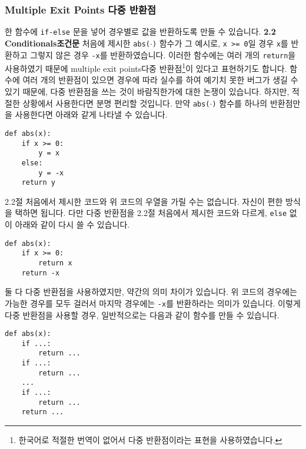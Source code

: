 \documentclass[../main.tex]{subfiles}
\begin{document}
\subsubsection{Multiple Exit Points 다중 반환점}
한 함수에 \texttt{if-else} 문을 넣어 경우별로 값을 반환하도록 만들 수 있습니다.
\textbf{2.2 Conditionals조건문} 처음에 제시한 \texttt{abs($\cdot$)} 함수가 그
예시로, \texttt{x >= 0}일 경우 \texttt{x}를 반환하고 그렇지 않은 경우
\texttt{-x}를 반환하였습니다.  이러한 함수에는 여러 개의 \texttt{return}을
사용하였기 때문에 multiple exit points다중 반환점\footnote{한국어로 적절한
번역이 없어서 다중 반환점이라는 표현을 사용하였습니다.}이 있다고 표현하기도
합니다.  함수에 여러 개의 반환점이 있으면 경우에 따라 실수를 하여 예기치 못한
버그가 생길 수 있기 때문에, 다중 반환점을 쓰는 것이 바람직한가에 대한 논쟁이
있습니다.  하지만, 적절한 상황에서 사용한다면 분명 편리할 것입니다.  만약
\texttt{abs($\cdot$)} 함수를 하나의 반환점만을 사용한다면 아래와 같게 나타낼 수
있습니다.
\begin{verbatim}
def abs(x):
    if x >= 0:
        y = x
    else:
        y = -x
    return y
\end{verbatim}
2.2절 처음에서 제시한 코드와 위 코드의 우열을 가릴 수는 없습니다.
자신이 편한 방식을 택하면 됩니다.
다만 다중 반환점을 2.2절 처음에서 제시한 코드와 다르게, \texttt{else} 없이
아래와 같이 다시 쓸 수 있습니다.
\begin{verbatim}
def abs(x):
    if x >= 0:
        return x
    return -x
\end{verbatim}
둘 다 다중 반환점을 사용하였지만, 약간의 의미 차이가 있습니다.  위 코드의
경우에는 가능한 경우를 모두 걸러서 마지막 경우에는 \texttt{-x}를 반환하라는
의미가 있습니다.  이렇게 다중 반환점을 사용할 경우, 일반적으로는 다음과 같이
함수를 만들 수 있습니다.
\begin{verbatim}
def abs(x):
    if ...:
        return ...
    if ...:
        return ...
    ...
    if ...:
        return ...
    return ...
\end{verbatim}
\end{document}
